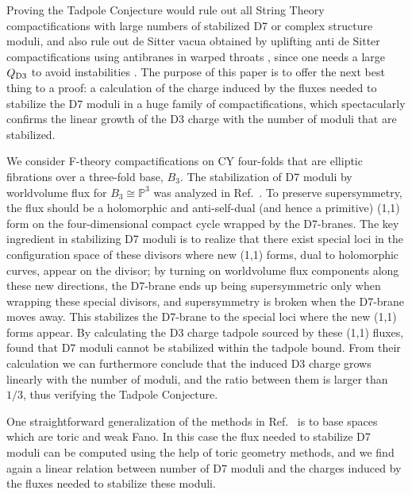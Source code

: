 \documentclass[a4paper,12pt]{article}
\numberwithin{equation}{section}
\newcommand{\mbb}{\mathbb}
\newcommand{\fthb}{B_3}				%
\begin{document}
Proving the Tadpole Conjecture would rule out all String Theory compactifications with large numbers of stabilized D7 or complex structure moduli, and also rule out de Sitter vacua obtained by uplifting anti de Sitter compactifications using antibranes in warped throats \cite{Kachru:2003aw}, since one needs a large $Q_{\rm D3}$ to avoid instabilities \cite{Bena:2018fqc}.  The purpose of this paper is to offer the next best thing to a proof: a calculation of the charge induced by the fluxes needed to stabilize the D7 moduli in a huge  family of compactifications, which spectacularly confirms the linear growth of the D3 charge with the number of moduli that are stabilized. 

We consider F-theory compactifications on CY four-folds that are elliptic fibrations over a three-fold base, $\fthb$. The stabilization of D7 moduli by worldvolume flux for $\fthb \cong \mbb{P}^3$ was analyzed in Ref.~\cite{Collinucci:2008pf}. To preserve supersymmetry, the flux should be a holomorphic and anti-self-dual (and hence a primitive) (1,1) form on the four-dimensional compact cycle wrapped by the D7-branes. The key ingredient in stabilizing D7 moduli is to realize that there exist special loci in the configuration space of these divisors where new (1,1) forms, dual to holomorphic curves, appear on the divisor; by turning on worldvolume flux components along these new directions, the D7-brane ends up being supersymmetric only when wrapping these special divisors, and supersymmetry is broken when the D7-brane moves away. This stabilizes the D7-brane to the special loci where the new (1,1) forms appear. By calculating the D3 charge tadpole sourced by these (1,1) fluxes, \cite{Collinucci:2008pf} found that D7 moduli cannot be stabilized within the tadpole bound. From their calculation we can furthermore conclude that the induced D3 charge grows linearly with the number of moduli, and the ratio between them is larger than $1/3$, thus verifying the Tadpole Conjecture. 

One straightforward generalization of the methods in Ref.~\cite{Collinucci:2008pf} is to base spaces which are toric and weak Fano. In this case the flux needed to stabilize D7 moduli can be computed using the help of toric geometry methods, and we find again a linear relation between number of D7 moduli and the charges induced by the fluxes needed to stabilize these moduli.
\end{document}

